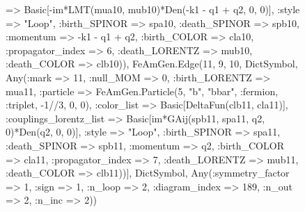 \documentclass{revtex4}
\begin{document}
\begin{figure}[!htb]
\begin{center}
{=> Basic[-im*LMT(mua10, mub10)*Den(-k1 - q1 + q2, 0, 0)], :style => "Loop", :birth_SPINOR => spa10, :death_SPINOR => spb10, :momentum => -k1 - q1 + q2, :birth_COLOR => cla10, :propagator_index => 6, :death_LORENTZ => mub10, :death_COLOR => clb10)), FeAmGen.Edge(11, 9, 10, Dict{Symbol, Any}(:mark => 11, :null_MOM => 0, :birth_LORENTZ => mua11, :particle => FeAmGen.Particle(5, "b", "bbar", :fermion, :triplet, -1//3, 0, 0), :color_list => Basic[DeltaFun(clb11, cla11)], :couplings_lorentz_list => Basic[im*GAij(spb11, spa11, q2, 0)*Den(q2, 0, 0)], :style => "Loop", :birth_SPINOR => spa11, :death_SPINOR => spb11, :momentum => q2, :birth_COLOR => cla11, :propagator_index => 7, :death_LORENTZ => mub11, :death_COLOR => clb11))], Dict{Symbol, Any}(:symmetry_factor => 1, :sign => 1, :n_loop => 2, :diagram_index => 189, :n_out => 2, :n_inc => 2)) 
}
\end{center}
\end{figure}
\end{document}
